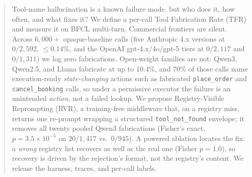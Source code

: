 \documentclass{article}
\begin{document}

\printAffiliationsAndNotice{}

\begin{abstract}
Tool-name hallucination is a known failure mode, but who does it, how
often, and what fixes it? We define a per-call Tool Fabrication Rate
(TFR) and measure it on BFCL multi-turn. Commercial frontiers are silent.
Across $6{,}000{+}$ opaque-baseline calls (five Anthropic 4.x versions at
$0/2{,}592$, $\leq\!0.14\%$, and the OpenAI gpt-4.x/4o/gpt-5 tiers at
$0/2{,}117$ and $0/1{,}311$) we log zero fabrications. Open-weight
families are not: Qwen3, Qwen2.5, and Llama fabricate at up to
$\mathbf{10.4\%}$, and $70\%$ of those calls name execution-ready
\emph{state-changing} actions such as fabricated \texttt{place\_order} and
\texttt{cancel\_booking} calls, so under a permissive executor the
failure is an unintended \emph{action}, not a failed lookup. We propose
Registry-Visible Reprompting (RVR), a training-free middleware that, on a
registry miss, returns one re-prompt wrapping a structured
\texttt{tool\_not\_found} envelope; it removes all twenty pooled Qwen3
fabrications (Fisher's exact, $p=3.5\!\times\!10^{-5}$ on $20/1{,}417$
vs.\ $0/945$). A powered ablation locates the fix: a \emph{wrong}
registry list recovers as well as the real one (Fisher $p=1.0$), so
recovery is driven by the rejection's format, not the registry's content.
We release the harness, traces, and per-call labels.
\end{abstract}














\end{document}
